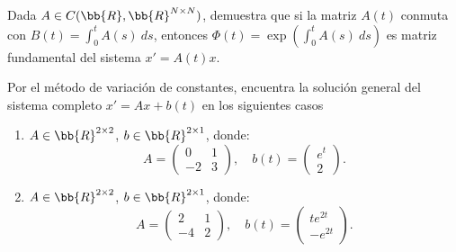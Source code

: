 \begin{ejercicio}\label{ej:5.9}
    Dada $A \in C(\bb{R}, \bb{R}^{N\times N})$, demuestra que si la matriz $A(t)$ conmuta con $B(t) = \displaystyle \int_0^t A(s)~ds$, entonces $\Phi(t) = \exp\left(\displaystyle \int_0^t A(s)~ds\right)$ es matriz fundamental del sistema $x' = A(t)x$.
\end{ejercicio}

\begin{ejercicio}\label{ej:5.10}
    Por el método de variación de constantes, encuentra la solución general del sistema completo $x' = Ax + b(t)$ en los siguientes casos
    \begin{enumerate}
        \item $A\in \bb{R}^{2\times 2}$, $b\in \bb{R}^{2\times 1}$, donde:
        \[
            A =
            \begin{pmatrix}
                0 & 1\\
                -2 & 3
            \end{pmatrix},
            \quad
            b(t) =
            \begin{pmatrix}
                e^t \\ 2
            \end{pmatrix}.
        \]
        \item $A\in \bb{R}^{2\times 2}$, $b\in \bb{R}^{2\times 1}$, donde:
        \[
            A =
            \begin{pmatrix}
                2 & 1\\
                -4 & 2
            \end{pmatrix},
            \quad
            b(t) =
            \begin{pmatrix}
                te^{2t} \\ -e^{2t}
            \end{pmatrix}.
        \]
    \end{enumerate}
\end{ejercicio}

